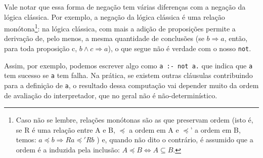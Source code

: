 \documentclass{article}
\theoremstyle{definition}
\theoremstyle{remark}
\begin{document}
Vale notar que essa forma de negação tem várias diferenças com a negação da lógica clássica. Por exemplo, a negação da lógica clássica é uma relação monótona\footnote{Caso não se lembre, relações monótonas são as que preservam ordem (isto é, se R é uma relação entre A e B, $\preceq$ a ordem em A e $\preceq$' a ordem em B, temos: $a \preceq b \Rightarrow Ra \preceq' Rb$ ) e, quando não dito o contrário, é assumido que a ordem é a induzida pela inclusão: $A \preceq B \Leftrightarrow A \subseteq
  B$.}: na lógica clássica, com mais a adição de proposições permite a derivação de, pelo menos, a mesma quantidade de conclusões (se $b \Rightarrow a$, então, para toda proposição c, $b \wedge c \Rightarrow a$), o que segue não é verdade com o nosso {\tt not}.

Assim, por exemplo, podemos escrever algo como {\tt a :- not a.} que indica que {\tt a} tem sucesso se {\tt a} tem falha. Na prática, se existem outras cláusulas contribuindo para a definição de {\tt a}, o resultado dessa computação vai depender muito da ordem de avaliação do interpretador, que no geral não é não-determinístico.
\end{document}
